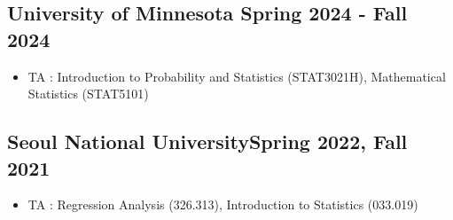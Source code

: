 \vspace*{10pt}

\subsection{{University of Minnesota} \hfill Spring 2024 - Fall 2024}
\vspace{0.5mm}
\begin{itemize}
    \item TA : Introduction to Probability and Statistics (STAT3021H), Mathematical Statistics (STAT5101)
\end{itemize}

\smallskip

\subsection {{Seoul National University}\hfill Spring 2022, Fall 2021}
\vspace{0.5mm}
\begin{itemize}
    \item  TA : Regression Analysis (326.313),  Introduction to Statistics (033.019)
\end{itemize}